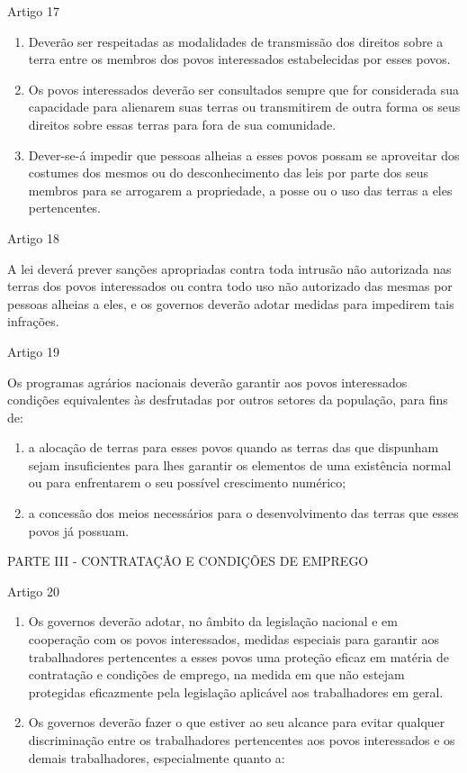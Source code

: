 \documentclass[
]{book}
\begin{document}
Artigo 17

\begin{enumerate}
\def\labelenumi{\arabic{enumi}.}
\item
  Deverão ser respeitadas as modalidades de transmissão dos direitos sobre a terra entre os membros dos povos interessados estabelecidas por esses povos.
\item
  Os povos interessados deverão ser consultados sempre que for considerada sua capacidade para alienarem suas terras ou transmitirem de outra forma os seus direitos sobre essas terras para fora de sua comunidade.
\item
  Dever-se-á impedir que pessoas alheias a esses povos possam se aproveitar dos costumes dos mesmos ou do desconhecimento das leis por parte dos seus membros para se arrogarem a propriedade, a posse ou o uso das terras a eles pertencentes.
\end{enumerate}

Artigo 18

A lei deverá prever sanções apropriadas contra toda intrusão não autorizada nas terras dos povos interessados ou contra todo uso não autorizado das mesmas por pessoas alheias a eles, e os governos deverão adotar medidas para impedirem tais infrações.

Artigo 19

Os programas agrários nacionais deverão garantir aos povos interessados condições equivalentes às desfrutadas por outros setores da população, para fins de:

\begin{enumerate}
\def\labelenumi{\alph{enumi})}
\item
  a alocação de terras para esses povos quando as terras das que dispunham sejam insuficientes para lhes garantir os elementos de uma existência normal ou para enfrentarem o seu possível crescimento numérico;
\item
  a concessão dos meios necessários para o desenvolvimento das terras que esses povos já possuam.
\end{enumerate}

PARTE III - CONTRATAÇÃO E CONDIÇÕES DE EMPREGO

Artigo 20

\begin{enumerate}
\def\labelenumi{\arabic{enumi}.}
\item
  Os governos deverão adotar, no âmbito da legislação nacional e em cooperação com os povos interessados, medidas especiais para garantir aos trabalhadores pertencentes a esses povos uma proteção eficaz em matéria de contratação e condições de emprego, na medida em que não estejam protegidas eficazmente pela legislação aplicável aos trabalhadores em geral.
\item
  Os governos deverão fazer o que estiver ao seu alcance para evitar qualquer discriminação entre os trabalhadores pertencentes aos povos interessados e os demais trabalhadores, especialmente quanto a:
\end{enumerate}
\end{document}
